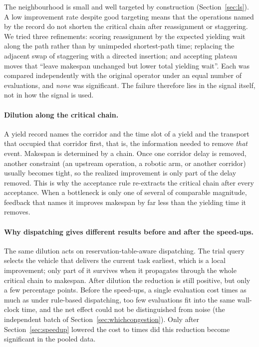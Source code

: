 The neighbourhood is small and well targeted by construction (Section~\ref{sec:ls}). A low improvement rate despite good targeting means that the operations named by the record do not shorten the critical chain after reassignment or staggering.
We tried three refinements: scoring reassignment by the expected yielding wait along the path rather than by unimpeded shortest-path time; replacing the adjacent swap of staggering with a directed insertion; and accepting plateau moves that ``leave makespan unchanged but lower total yielding wait''. Each was compared independently with the original operator under an equal number of evaluations, and \emph{none} was significant. The failure therefore lies in the signal itself, not in how the signal is used.

\paragraph{Dilution along the critical chain.}
A yield record names the corridor and the time slot of a yield and the transport that occupied that corridor first, that is, the information needed to remove \emph{that} event.
Makespan is determined by a chain. Once one corridor delay is removed, another constraint (an upstream operation, a robotic arm, or another corridor) usually becomes tight, so the realized improvement is only part of the delay removed.
This is why the acceptance rule re-extracts the critical chain after every acceptance. When a bottleneck is only one of several of comparable magnitude, feedback that names it improves makespan by far less than the yielding time it removes.

\paragraph{Why dispatching gives different results before and after the speed-ups.}
The same dilution acts on reservation-table-aware dispatching. The trial query selects the vehicle that delivers the current task earliest, which is a local improvement; only part of it survives when it propagates through the whole critical chain to makespan.
After dilution the reduction is still positive, but only a few percentage points. Before the speed-ups, a single evaluation cost \CostMultBefore{} times as much as under rule-based dispatching, too few evaluations fit into the same wall-clock time, and the net effect could not be distinguished from noise (the independent batch of Section~\ref{sec:whichcongestion}).
Only after Section~\ref{sec:speedup} lowered the cost to \CostMultAfter{} times did this reduction become significant in the pooled data.


